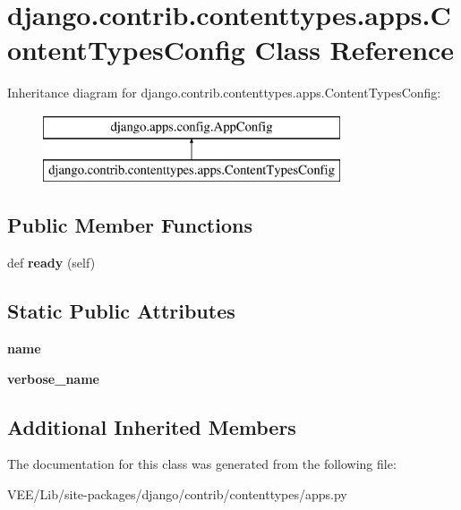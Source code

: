 \hypertarget{classdjango_1_1contrib_1_1contenttypes_1_1apps_1_1_content_types_config}{}\section{django.\+contrib.\+contenttypes.\+apps.\+Content\+Types\+Config Class Reference}
\label{classdjango_1_1contrib_1_1contenttypes_1_1apps_1_1_content_types_config}
Inheritance diagram for django.\+contrib.\+contenttypes.\+apps.\+Content\+Types\+Config\+:\begin{figure}[H]
\begin{center}
\leavevmode
\includegraphics[height=2.000000cm]{classdjango_1_1contrib_1_1contenttypes_1_1apps_1_1_content_types_config}
\end{center}
\end{figure}
\subsection*{Public Member Functions}
\begin{DoxyCompactItemize}
\item 
\mbox{\label{classdjango_1_1contrib_1_1contenttypes_1_1apps_1_1_content_types_config_ab1137ba892070fc45e6431dd843bb30e}} 
def {\bfseries ready} (self)
\end{DoxyCompactItemize}
\subsection*{Static Public Attributes}
\begin{DoxyCompactItemize}
\item 
\mbox{\label{classdjango_1_1contrib_1_1contenttypes_1_1apps_1_1_content_types_config_a730ccf21896baa4d4eddf3c5773cc564}} 
{\bfseries name}
\item 
\mbox{\label{classdjango_1_1contrib_1_1contenttypes_1_1apps_1_1_content_types_config_a857f5284280512105d682c16c161f7cd}} 
{\bfseries verbose\+\_\+name}
\end{DoxyCompactItemize}
\subsection*{Additional Inherited Members}


The documentation for this class was generated from the following file\+:\begin{DoxyCompactItemize}
\item 
V\+E\+E/\+Lib/site-\/packages/django/contrib/contenttypes/apps.\+py\end{DoxyCompactItemize}
